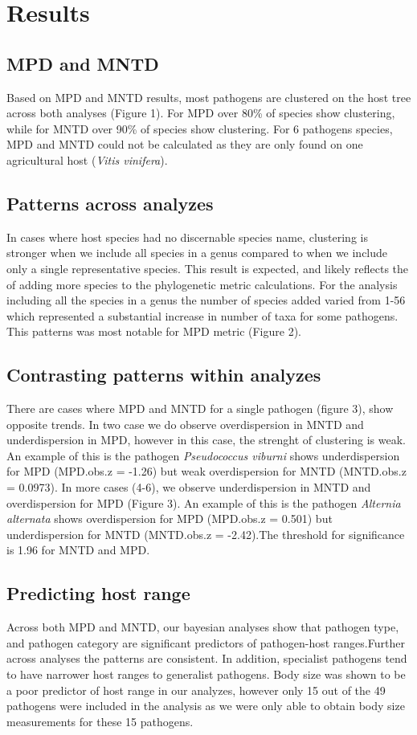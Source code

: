 \documentclass[12pt,letter]{article}
\begin{document}
\section{Results}
\subsection{MPD and MNTD}
Based on MPD and MNTD results, most pathogens are clustered on the host tree across both analyses (Figure 1). For MPD over 80\% of species show clustering, while for MNTD over 90\% of species show clustering. For 6 pathogens species, MPD and MNTD could not be calculated as they are only found on one agricultural host (\textit{Vitis vinifera}). 

\subsection{Patterns across analyzes}
In cases where host species had no discernable species name, clustering is stronger when we include all species in a genus compared to when we include only a single representative species. This result is expected, and likely reflects the of adding more species to the phylogenetic metric calculations. For the analysis including all the species in a genus the number of species added varied from 1-56 which represented a substantial increase in number of taxa for some pathogens. This patterns was most notable for MPD metric (Figure 2). 

\subsection{Contrasting patterns within analyzes}
There are cases where MPD and MNTD for a single pathogen (figure 3), show opposite trends. In two case we do observe overdispersion in MNTD and underdispersion in MPD, however in this case, the strenght of clustering is weak. An example of this is the pathogen \textit{Pseudococcus viburni} shows underdispersion for MPD (MPD.obs.z = -1.26) but weak overdispersion for MNTD (MNTD.obs.z = 0.0973). In more cases (4-6), we observe underdispersion in MNTD and overdispersion for MPD (Figure 3). An example of this is the pathogen \textit{Alternia alternata} shows overdispersion for MPD (MPD.obs.z = 0.501) but underdispersion for MNTD (MNTD.obs.z = -2.42).The threshold for significance is 1.96 for MNTD and MPD.

\subsection{Predicting host range}
Across both MPD and MNTD, our bayesian analyses show that pathogen type, and pathogen category are significant predictors of pathogen-host ranges.Further across analyses the patterns are consistent. In addition, specialist pathogens tend to have narrower host ranges to generalist pathogens. Body size was shown to be a poor predictor of host range in our analyzes, however only 15 out of the 49 pathogens were included in the analysis as we were only able to obtain body size measurements for these 15 pathogens. 
\end{document}

